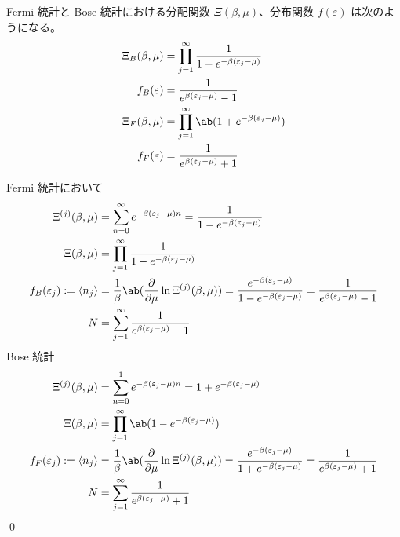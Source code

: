 \documentclass[uplatex,diffipdfmx,a4paper,11pt]{jlreq}
\makeatletter
\theoremstyle{definition}
\renewenvironment{proof}[1][\proofname]{\par
  \normalfont
  \topsep6\p@\@plus6\p@ \trivlist
  \item[\hskip\labelsep{\bfseries #1}\@addpunct{\bfseries}]\ignorespaces\quad\par
}{%
  \qed\endtrivlist\@endpefalse
}
\renewcommand\proofname{証明}
\makeatother
\begin{document}
\begin{theorem}[分配関数と分布関数]
  Fermi 統計と Bose 統計における分配関数 $\Xi(\beta,\mu)$、分布関数 $f(\varepsilon)$ は次のようになる。
  \begin{align}
    \Xi_B(\beta, \mu) & = \prod_{j=1}^{\infty}\frac{1}{1 - e^{-\beta(\varepsilon_j - \mu)}} \\
    f_B(\varepsilon)  & = \frac{1}{e^{\beta(\varepsilon_j - \mu)} - 1}                      \\
    \Xi_F(\beta, \mu) & = \prod_{j=1}^{\infty}\ab(1 + e^{-\beta(\varepsilon_j - \mu)})      \\
    f_F(\varepsilon)  & = \frac{1}{e^{\beta(\varepsilon_j - \mu)} + 1}
  \end{align}
\end{theorem}
\begin{proof}
  Fermi 統計において
  \begin{align}
    \Xi^{(j)}(\beta, \mu)                    & = \sum_{n=0}^{\infty}e^{-\beta(\varepsilon_j - \mu)n} = \frac{1}{1 - e^{-\beta(\varepsilon_j - \mu)}}                                                                                   \\
    \Xi(\beta, \mu)                          & = \prod_{j=1}^{\infty}\frac{1}{1 - e^{-\beta(\varepsilon_j - \mu)}}                                                                                                                     \\
    f_B(\varepsilon_j) := \langle n_j\rangle & = \frac{1}{\beta}\ab(\diffp{}{\mu}\ln\Xi^{(j)}(\beta,\mu)) = \frac{e^{-\beta(\varepsilon_j - \mu)}}{1 - e^{-\beta(\varepsilon_j - \mu)}} = \frac{1}{e^{\beta(\varepsilon_j - \mu)} - 1} \\
    N                                        & = \sum_{j=1}^{\infty}\frac{1}{e^{\beta(\varepsilon_j - \mu)} - 1}
  \end{align}
  Bose 統計
  \begin{align}
    \Xi^{(j)}(\beta, \mu)                    & = \sum_{n=0}^{1}e^{-\beta(\varepsilon_j - \mu)n} = 1 + e^{-\beta(\varepsilon_j - \mu)}                                                                                                  \\
    \Xi(\beta, \mu)                          & = \prod_{j=1}^{\infty}\ab(1 - e^{-\beta(\varepsilon_j - \mu)})                                                                                                                          \\
    f_F(\varepsilon_j) := \langle n_j\rangle & = \frac{1}{\beta}\ab(\diffp{}{\mu}\ln\Xi^{(j)}(\beta,\mu)) = \frac{e^{-\beta(\varepsilon_j - \mu)}}{1 + e^{-\beta(\varepsilon_j - \mu)}} = \frac{1}{e^{\beta(\varepsilon_j - \mu)} + 1} \\
    N                                        & = \sum_{j=1}^{\infty}\frac{1}{e^{\beta(\varepsilon_j - \mu)} + 1}
  \end{align}
\end{proof}
\end{document}
